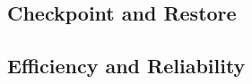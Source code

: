\subsection{Checkpoint and Restore} \label{sec:checkpoint}







\subsection{Efficiency and Reliability} \label{sec:output-discuss}



